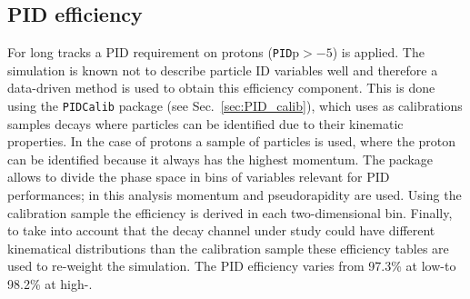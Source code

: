 \subsection{PID efficiency}
\label{sec:PIDeff}
For long tracks a PID requirement on protons (\verb!PID!p$ > -5$) is applied. The simulation is known not to
describe particle ID variables well and therefore a data-driven method is used to obtain this efficiency component.
This is done using the \verb!PIDCalib! package (see Sec.~\ref{sec:PID_calib}), which uses as calibrations samples
decays where particles can be identified due to their kinematic properties. In the case of protons a sample of
\Lz particles is used, where the proton can be identified because it always has the highest momentum.
The package allows to divide the phase space in bins of variables relevant for PID
performances; in this analysis momentum and pseudorapidity are used.
Using the calibration sample the efficiency is derived in each two-dimensional bin.
Finally, to take into account that the decay channel under study could have different kinematical distributions
than the calibration sample these efficiency tables are used to re-weight the simulation.
The PID efficiency varies from 97.3\% at low-\qsq to 98.2\% at high-\qsq. 
%



